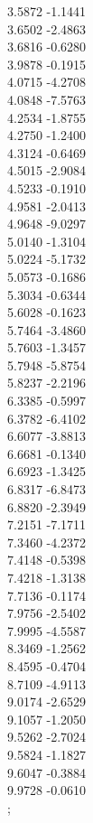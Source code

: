 {            3.5872	-1.1441\\
            3.6502	-2.4863\\
            3.6816	-0.6280\\
            3.9878	-0.1915\\
            4.0715	-4.2708\\
            4.0848	-7.5763\\
            4.2534	-1.8755\\
            4.2750	-1.2400\\
            4.3124	-0.6469\\
            4.5015	-2.9084\\
            4.5233	-0.1910\\
            4.9581	-2.0413\\
            4.9648	-9.0297\\
            5.0140	-1.3104\\
            5.0224	-5.1732\\
            5.0573	-0.1686\\
            5.3034	-0.6344\\
            5.6028	-0.1623\\
            5.7464	-3.4860\\
            5.7603	-1.3457\\
            5.7948	-5.8754\\
            5.8237	-2.2196\\
            6.3385	-0.5997\\
            6.3782	-6.4102\\
            6.6077	-3.8813\\
            6.6681	-0.1340\\
            6.6923	-1.3425\\
            6.8317	-6.8473\\
            6.8820	-2.3949\\
            7.2151	-7.1711\\
            7.3460	-4.2372\\
            7.4148	-0.5398\\
            7.4218	-1.3138\\
            7.7136	-0.1174\\
            7.9756	-2.5402\\
            7.9995	-4.5587\\
            8.3469	-1.2562\\
            8.4595	-0.4704\\
            8.7109	-4.9113\\
            9.0174	-2.6529\\
            9.1057	-1.2050\\
            9.5262	-2.7024\\
            9.5824	-1.1827\\
            9.6047	-0.3884\\
            9.9728	-0.0610\\
        };
